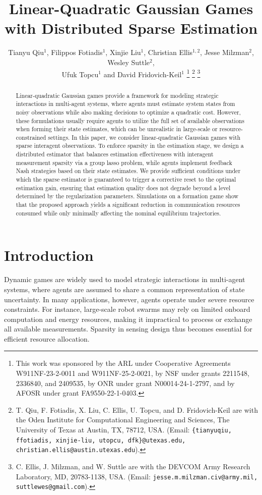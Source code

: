 \documentclass[letterpaper, 10 pt, conference]{ieeeconf}  %
\title{\LARGE \bf
Linear-Quadratic Gaussian Games with Distributed Sparse Estimation
}
\author{Tianyu Qiu$^1$, Filippos Fotiadis$^1$, Xinjie Liu$^1$, Christian Ellis$^{1,2}$, Jesse Milzman$^2$, Wesley Suttle$^2$,\\ Ufuk Topcu$^1$ and David Fridovich-Keil$^1$%
\thanks{This work was sponsored by the ARL under Cooperative Agreements W911NF-23-2-0011 and W911NF-25-2-0021, by NSF under grants 2211548, 2336840, and 2409535, by ONR under grant N00014-24-1-2797, and by AFOSR under grant  FA9550-22-1-0403.}%
\thanks{T. Qiu, F. Fotiadis, X. Liu, C. Ellis, U. Topcu, and D. Fridovich-Keil are with the Oden Institute for Computational Engineering and Sciences, The University of Texas at Austin, TX, 78712, USA. 
(Email:  {\tt \{tianyuqiu, ffotiadis, xinjie-liu, utopcu, dfk\}@utexas.edu, christian.ellis@austin.utexas.edu}).
}%
\thanks{
C. Ellis, J. Milzman, and W. Suttle are with the DEVCOM Army Research Laboratory, MD, 20783-1138, USA. 
(Email:  {\tt jesse.m.milzman.civ@army.mil, suttlewes@gmail.com}).
}
}
\begin{document}
\maketitle
\thispagestyle{empty}
\pagestyle{empty}


\begin{abstract}
Linear-quadratic Gaussian games provide a framework for modeling strategic interactions in multi-agent systems, where agents must estimate system states from noisy observations while also making decisions to optimize a quadratic cost. However, these formulations usually require agents to utilize the full set of available observations when forming their state estimates, which can be unrealistic in large-scale or resource-constrained settings. In this paper, we consider linear-quadratic Gaussian games with sparse interagent observations. To enforce sparsity in the estimation stage, we design a distributed estimator that balances estimation effectiveness with interagent measurement sparsity via a group lasso problem, while agents implement feedback Nash strategies based on their state estimates. We provide sufficient conditions under which the sparse estimator is guaranteed to trigger a corrective reset to the optimal estimation gain, ensuring that estimation quality does not degrade beyond a level determined by the regularization parameters. Simulations on a formation game show that the proposed approach yields a significant reduction in communication resources consumed while only minimally affecting the nominal equilibrium trajectories.
\end{abstract}


\section{Introduction}
\label{sec:introduction}

Dynamic games are widely used to model strategic interactions in multi-agent systems, where agents are assumed to share a common representation of state uncertainty.
In many applications, however, agents operate under severe resource constraints. For instance, large-scale robot swarms may rely on limited onboard computation and energy resources, making it impractical to process or exchange all available measurements. Sparsity in sensing design thus becomes essential
for efficient resource allocation. 
\end{document}
